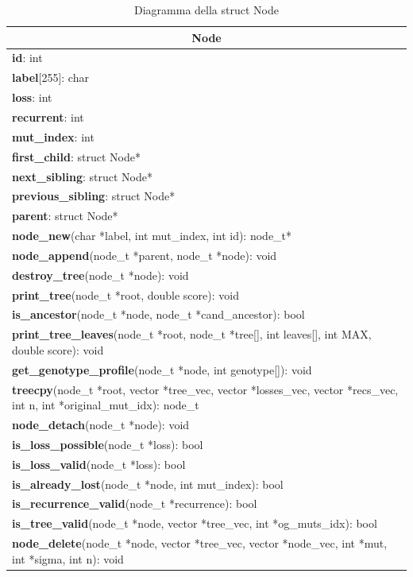 \documentclass[12pt]{report}
\begin{document}
  \begin{table}[H]
    \tiny
    \centering
    \begin{tabular}{|l|}
     \hline
     \multicolumn{1}{|c|}{\textbf{Node}} \\
     \hline
     \textbf{id}: int\\
     \textbf{label}[255]: char \\
     \textbf{loss}: int \\
     \textbf{recurrent}: int \\
     \textbf{mut\_index}: int \\
     \textbf{first\_child}: struct Node*\\
     \textbf{next\_sibling}: struct Node*\\
     \textbf{previous\_sibling}: struct Node*\\
     \textbf{parent}: struct Node*\\
     \hline
     \textbf{node\_new}(char *label, int mut\_index, int id): node\_t*\\
     \textbf{node\_append}(node\_t *parent, node\_t *node): void\\
     \textbf{destroy\_tree}(node\_t *node): void\\
     \textbf{print\_tree}(node\_t *root, double score): void\\
     \textbf{is\_ancestor}(node\_t *node, node\_t *cand\_ancestor): bool\\
     \textbf{print\_tree\_leaves}(node\_t *root, node\_t *tree[], int leaves[], int MAX, double score): void\\
     \textbf{get\_genotype\_profile}(node\_t *node, int genotype[]): void\\
     \textbf{treecpy}(node\_t *root, vector *tree\_vec, vector *losses\_vec, vector *recs\_vec, int n, int *original\_mut\_idx): node\_t\\*
     \textbf{node\_detach}(node\_t *node): void\\
     \textbf{is\_loss\_possible}(node\_t *loss): bool\\
     \textbf{is\_loss\_valid}(node\_t *loss): bool\\
     \textbf{is\_already\_lost}(node\_t *node, int mut\_index): bool\\
     \textbf{is\_recurrence\_valid}(node\_t *recurrence): bool\\
     \textbf{is\_tree\_valid}(node\_t *node, vector *tree\_vec, int *og\_muts\_idx): bool\\
     \textbf{node\_delete}(node\_t *node, vector *tree\_vec, vector *node\_vec, int *mut, int *sigma, int n): void\\
     \hline
    \end{tabular}
    \caption{Diagramma della struct Node}
  \end{table}
\end{document}

